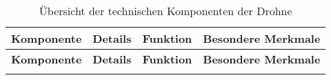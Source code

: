 \renewcommand{\arraystretch}{1.3} %

\begin{longtable}{|l|p{4cm}|p{4cm}|p{4cm}|}
	\caption{Übersicht der technischen Komponenten der Drohne} \label{tab:DrohnenKomponenten} \\ \hline
	\textbf{Komponente}       & \textbf{Details}                                                                                                   & \textbf{Funktion}                                                                                                           & \textbf{Besondere Merkmale}                                                                                     \\ \hline
	\endfirsthead %
	
	\hline
	\textbf{Komponente}       & \textbf{Details}                                                                                                   & \textbf{Funktion}                                                                                                           & \textbf{Besondere Merkmale}                                                                                     \\ \hline
	\endhead %
	
	\hline
	\endfoot %
	
	\hline
	\endlastfoot %
	

\end{longtable}
